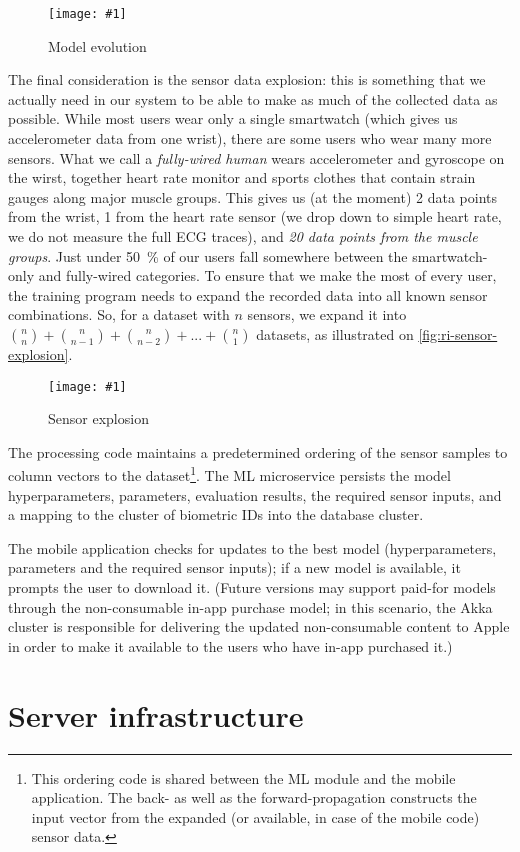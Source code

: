 \documentclass[a4paper, 10 pt, conference]{IEEEtran}
\newcommand{\fig}[3]{
  \begin{figure}[h]
    \begin{center}
        \caption{#3}
        \texttt{[image: \#1]}
        \label{fig:#2}
    \end{center}
  \end{figure}
}
\begin{document}
\fig{ri-model-evolution.png}{ri-model-evolution}{Model evolution}

The final consideration is the sensor data explosion: this is something that we actually need in our system to be able to make as much of the collected data as possible. While most users wear only a single smartwatch (which gives us accelerometer data from one wrist), there are some users who wear many more sensors. What we call a \emph{fully-wired human} wears accelerometer and gyroscope on the wirst, together heart rate monitor and sports clothes that contain strain gauges along major muscle groups. This gives us (at the moment) 2 data points from the wrist, 1 from the heart rate sensor (we drop down to simple heart rate, we do not measure the full ECG traces), and \emph{20 data points from the muscle groups}. Just under \SI{50}{\percent} of our users fall somewhere between the smartwatch-only and fully-wired categories. To ensure that we make the most of every user, the training program needs to expand the recorded data into all known sensor combinations. So, for a dataset with $n$ sensors, we expand it into $\binom nn + \binom n{n-1} + \binom n{n-2} + ... + \binom n1$ datasets, as illustrated on \autoref{fig:ri-sensor-explosion}. 

\fig{ri-sensor-explosion.png}{ri-sensor-explosion}{Sensor explosion}

The processing code maintains a predetermined ordering of the sensor samples to column vectors to the dataset\footnote{This ordering code is shared between the ML module and the mobile application. The back- as well as the forward-propagation constructs the input vector from the expanded (or available, in case of the mobile code) sensor data.}. The ML microservice persists the model hyperparameters, parameters, evaluation results, the required sensor inputs, and a mapping to the cluster of biometric IDs into the database cluster.

The mobile application checks for updates to the best model (hyperparameters, parameters and the required sensor inputs); if a new model is available, it prompts the user to download it. (Future versions may support paid-for models through the non-consumable in-app purchase model; in this scenario, the Akka cluster is responsible for delivering the updated non-consumable content to Apple in order to make it available to the users who have in-app purchased it.)

\section{Server infrastructure}
\end{document}
